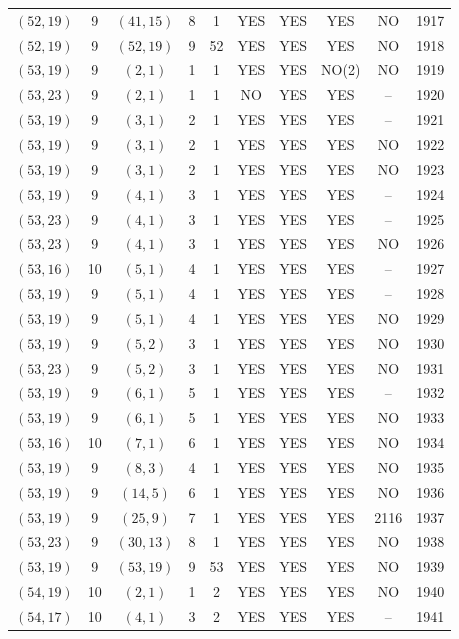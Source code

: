 \begin{longtable}{|c|c|c|c|c|c|c|c|c|c|}
$(52, 19)$ & 9 & $(41, 15)$ & 8 & 1 & YES & YES & YES & NO & 1917\\
$(52, 19)$ & 9 & $(52, 19)$ & 9 & 52 & YES & YES & YES & NO & 1918\\
$(53, 19)$ & 9 & $(2, 1)$ & 1 & 1 & YES & YES & NO(2) & NO & 1919\\
$(53, 23)$ & 9 & $(2, 1)$ & 1 & 1 & NO & YES & YES & -- & 1920\\
$(53, 19)$ & 9 & $(3, 1)$ & 2 & 1 & YES & YES & YES & -- & 1921\\
$(53, 19)$ & 9 & $(3, 1)$ & 2 & 1 & YES & YES & YES & NO & 1922\\
$(53, 19)$ & 9 & $(3, 1)$ & 2 & 1 & YES & YES & YES & NO & 1923\\
$(53, 19)$ & 9 & $(4, 1)$ & 3 & 1 & YES & YES & YES & -- & 1924\\
$(53, 23)$ & 9 & $(4, 1)$ & 3 & 1 & YES & YES & YES & -- & 1925\\
$(53, 23)$ & 9 & $(4, 1)$ & 3 & 1 & YES & YES & YES & NO & 1926\\
$(53, 16)$ & 10 & $(5, 1)$ & 4 & 1 & YES & YES & YES & -- & 1927\\
$(53, 19)$ & 9 & $(5, 1)$ & 4 & 1 & YES & YES & YES & -- & 1928\\
$(53, 19)$ & 9 & $(5, 1)$ & 4 & 1 & YES & YES & YES & NO & 1929\\
$(53, 19)$ & 9 & $(5, 2)$ & 3 & 1 & YES & YES & YES & NO & 1930\\
$(53, 23)$ & 9 & $(5, 2)$ & 3 & 1 & YES & YES & YES & NO & 1931\\
$(53, 19)$ & 9 & $(6, 1)$ & 5 & 1 & YES & YES & YES & -- & 1932\\
$(53, 19)$ & 9 & $(6, 1)$ & 5 & 1 & YES & YES & YES & NO & 1933\\
$(53, 16)$ & 10 & $(7, 1)$ & 6 & 1 & YES & YES & YES & NO & 1934\\
$(53, 19)$ & 9 & $(8, 3)$ & 4 & 1 & YES & YES & YES & NO & 1935\\
$(53, 19)$ & 9 & $(14, 5)$ & 6 & 1 & YES & YES & YES & NO & 1936\\
$(53, 19)$ & 9 & $(25, 9)$ & 7 & 1 & YES & YES & YES & 2116 & 1937\\
$(53, 23)$ & 9 & $(30, 13)$ & 8 & 1 & YES & YES & YES & NO & 1938\\
$(53, 19)$ & 9 & $(53, 19)$ & 9 & 53 & YES & YES & YES & NO & 1939\\
$(54, 19)$ & 10 & $(2, 1)$ & 1 & 2 & YES & YES & YES & NO & 1940\\
$(54, 17)$ & 10 & $(4, 1)$ & 3 & 2 & YES & YES & YES & -- & 1941\\

\end{longtable}
